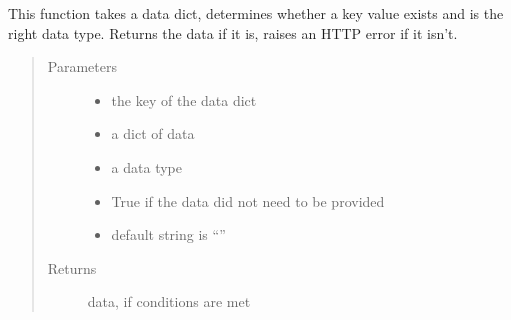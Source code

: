 \documentclass[letterpaper,10pt,english]{sphinxmanual}
\begin{document}

\begin{fulllineitems}
\label{\detokenize{apidoc/utdesign_procurement:utdesign_procurement.utils.checkValidData}}
This function takes a data dict, determines whether a key value exists
and is the right data type. Returns the data if it is, raises an
HTTP error if it isn’t.
\begin{quote}\begin{description}
\item[{Parameters}] \leavevmode\begin{itemize}
\item {} 
 \textendash{} the key of the data dict

\item {} 
 \textendash{} a dict of data

\item {} 
 \textendash{} a data type

\item {} 
 \textendash{} True if the data did not need to be provided

\item {} 
 \textendash{} default string is “”

\end{itemize}

\item[{Returns}] \leavevmode
data, if conditions are met

\end{description}\end{quote}

\end{fulllineitems}

\end{document}
